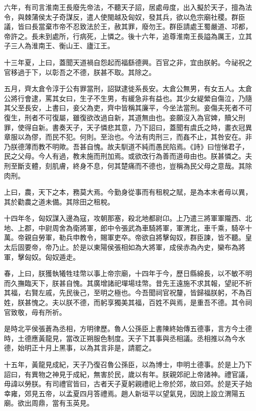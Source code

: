 六年，有司言淮南王長廢先帝法，不聽天子詔，居處毋度，出入擬於天子，擅為法令，與棘蒲侯太子奇謀反，遣人使閩越及匈奴，發其兵，欲以危宗廟社稷。群臣議，皆曰長當棄市帝不忍致法於王，赦其罪，廢勿王。群臣請處王蜀嚴道、邛都，帝許之。長未到處所，行病死，上憐之。後十六年，追尊淮南王長謚為厲王，立其子三人為淮南王、衡山王、廬江王。

十三年夏，上曰，蓋聞天道禍自怨起而福繇德興。百官之非，宜由朕躬。今祕祝之官移過于下，以彰吾之不德，朕甚不取。其除之。

五月，齊太倉令淳于公有罪當刑，詔獄逮徙系長安。太倉公無男，有女五人。太倉公將行會逮，罵其女曰，生子不生男，有緩急非有益也。其少女緹縈自傷泣，乃隨其父至長安，上書曰，妾父為吏，齊中皆稱其廉平，今坐法當刑。妾傷夫死者不可復生，刑者不可復屬，雖復欲改過自新，其道無由也。妾願沒入為官婢，贖父刑罪，使得自新。書奏天子，天子憐悲其意，乃下詔曰，蓋聞有虞氏之時，畫衣冠異章服以為僇，而民不犯。何則。至治也。今法有肉刑三，而姦不止，其咎安在。非乃朕德薄而教不明歟。吾甚自愧。故夫馴道不純而愚民陷焉。《詩》曰愷悌君子，民之父母。今人有過，教未施而刑加焉。或欲改行為善而道毋由也。朕甚憐之。夫刑至斷支體，刻肌膚，終身不息，何其楚痛而不德也，豈稱為民父母之意哉。其除肉刑。

上曰，農，天下之本，務莫大焉。今勤身從事而有租稅之賦，是為本末者毋以異，其於勸農之道未備。其除田之租稅。

十四年冬，匈奴謀入邊為寇，攻朝那塞，殺北地都尉卬。上乃遣三將軍軍隴西、北地、上郡，中尉周舍為衛將軍，郎中令張武為車騎將軍，軍渭北，車千乘，騎卒十萬。帝親自勞軍，勒兵申教令，賜軍吏卒。帝欲自將擊匈奴，群臣諫，皆不聽。皇太后固要帝，帝乃止。於是以東陽侯張相如為大將軍，成侯赤為內史，欒布為將軍，擊匈奴。匈奴遁走。

春，上曰，朕獲執犧牲珪幣以事上帝宗廟，十四年于今，歷日縣綿長，以不敏不明而久撫臨天下，朕甚自愧。其廣增諸祀墠場珪幣。昔先王遠施不求其報，望祀不祈其福，右賢左戚，先民後己，至明之極也。今吾聞祠官祝釐，皆歸福朕躬，不為百姓，朕甚愧之。夫以朕不德，而躬享獨美其福，百姓不與焉，是重吾不德。其令祠官致敬，毋有所祈。

是時北平侯張蒼為丞相，方明律歷。魯人公孫臣上書陳終始傳五德事，言方今土德時，土德應黃龍見，當改正朔服色制度。天子下其事與丞相議。丞相推以為今水德，始明正十月上黑事，以為其言非是，請罷之。

十五年，黃龍見成紀，天子乃復召魯公孫臣，以為博士，申明土德事。於是上乃下詔曰，有異物之神見于成紀，無害於民，歲以有年。朕親郊祀上帝諸神。禮官議，毋諱以勞朕。有司禮官皆曰，古者天子夏躬親禮祀上帝於郊，故曰郊。於是天子始幸雍，郊見五帝，以孟夏四月答禮焉。趙人新垣平以望氣見，因說上設立渭陽五廟。欲出周鼎，當有玉英見。

